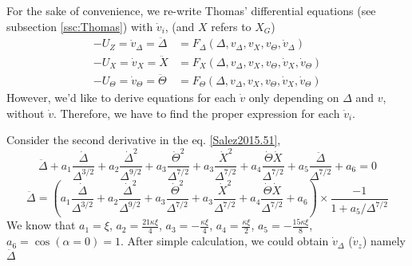 \documentclass[books,12pt]{elegantpaper}
\newcommand{\pder}[2][]{\frac{\partial#1}{\partial#2}}
\newcommand{\beq}{\begin{equation}}
\newcommand{\eeq}{\end{equation}}
\newcommand{\bgn}{\begin{align}}
\newcommand{\tlag}[1]{\tag{#1} \label{#1}}
\newcommand{\llang}{\left\langle}
\newcommand{\rrang}{\right\rangle}
\begin{document}
For the sake of convenience, we re-write Thomas'  differential equations (see subsection \ref{ssc:Thomas}) with $\dot{v}_i$, (and $X$ refers to $X_G$)
\beq \bgn
-U_Z = \dot{v}_\Delta = \ddot\Delta &= F_\Delta (\Delta,v_\Delta,v_X,v_\Theta,\dot{v}_\Delta) \\ %
-U_X = \dot{v}_X = \ddot{X} &= F_X (\Delta,v_\Delta,v_X,v_\Theta,\dot{v}_X,\dot{v}_\Theta)  \\ %
-U_\Theta = \dot{v}_\Theta = \ddot\Theta &= F_\Theta (\Delta,v_\Delta,v_X,v_\Theta,\dot{v}_X,\dot{v}_\Theta)  %
\end{align} \label{Yilin.1} \eeq
However, we'd like to derive equations for each $\dot{v}$ only depending on $\Delta$ and $v$, without $\dot{v}$. %
Therefore, we have to find the proper expression for each $\dot{v}_i$. 

Consider the second derivative in the eq. \ref{Salez2015.51}, 
\beq \ddot{\Delta} + a_1 \frac{\dot{\Delta}}{\Delta^{3/2}} + a_2 \frac{\dot{\Delta}^2}{\Delta^{9/2}} + a_3 \frac{\dot\Theta^2}{\Delta^{7/2}} + a_3 \frac{\dot{X}^2}{\Delta^{7/2}} + a_4 \frac{\dot\Theta \dot{X}}{\Delta^{7/2}} + a_5 \frac{\ddot\Delta}{\Delta^{7/2}} + a_6 = 0 \eeq
\beq \ddot\Delta = (a_1 \frac{\dot{\Delta}}{\Delta^{3/2}} + a_2 \frac{\dot{\Delta}^2}{\Delta^{9/2}} + a_3 \frac{\dot\Theta^2}{\Delta^{7/2}} + a_3 \frac{\dot{X}^2}{\Delta^{7/2}} + a_4 \frac{\dot\Theta \dot{X}}{\Delta^{7/2}} + a_6) \times \frac{-1}{1 + a_5 / \Delta^{7/2}} \eeq
We know that $a_1 = \xi$, $a_2 = \frac{21\kappa\xi}{4}$, $a_3 = -\frac{\kappa\xi}{4}$, $a_4 = \frac{\kappa\xi}{2}$, $a_5 = -\frac{15\kappa\xi}{8}$, $a_6 = \cos(\alpha=0) = 1$. After simple calculation, we could obtain $\dot{v}_\Delta$ ($\dot{v}_z$) namely $\ddot\Delta$




\end{document}
